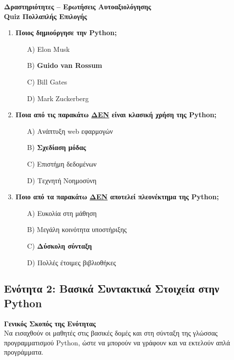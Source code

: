 \documentclass[11pt]{report}
\begin{document}
\vspace{1em}
\textbf{Δραστηριότητες – Ερωτήσεις Αυτοαξιολόγησης} \\[0.5em]
\textbf{Quiz Πολλαπλής Επιλογής}
\begin{enumerate}
    \item \textbf{Ποιος δημιούργησε την Python;}
    \begin{itemize}
        \item[A)] Elon Musk
        \item[B)] \textbf{Guido van Rossum}
        \item[C)] Bill Gates
        \item[D)] Mark Zuckerberg
    \end{itemize}

    \item \textbf{Ποια από τις παρακάτω \underline{ΔΕΝ} είναι κλασική χρήση της Python;}
    \begin{itemize}
        \item[A)] Ανάπτυξη web εφαρμογών
        \item[B)] \textbf{Σχεδίαση μόδας}
        \item[C)] Επιστήμη δεδομένων
        \item[D)] Τεχνητή Νοημοσύνη
    \end{itemize}

    \item \textbf{Ποιο από τα παρακάτω \underline{ΔΕΝ} αποτελεί πλεονέκτημα της Python;}
    \begin{itemize}
        \item[A)] Ευκολία στη μάθηση
        \item[B)] Μεγάλη κοινότητα υποστήριξης
        \item[C)] \textbf{Δύσκολη σύνταξη}
        \item[D)] Πολλές έτοιμες βιβλιοθήκες
    \end{itemize}
\end{enumerate}


\subsection{Ενότητα 2: Βασικά Συντακτικά Στοιχεία στην Python}

\textbf{Γενικός Σκοπός της Ενότητας} \\
Να εισαχθούν οι μαθητές στις βασικές δομές και στη σύνταξη της γλώσσας προγραμματισμού Python, ώστε να μπορούν να γράφουν και να εκτελούν απλά προγράμματα.
\end{document}
